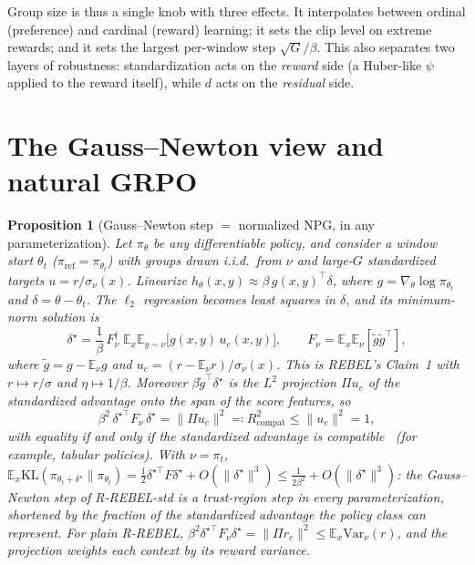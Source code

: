 \documentclass[11pt]{article}
\newtheorem{proposition}[theorem]{Proposition}
\theoremstyle{definition}
\theoremstyle{remark}
\newcommand{\E}{\mathbb{E}}
\newcommand{\KL}{\mathrm{KL}}
\newcommand{\Var}{\mathrm{Var}}
\newcommand{\pref}{\pi_{\mathrm{ref}}}
\newcommand{\1}{\mathbb{1}}
\newcommand{\rr}{R-REBEL}
\newcommand{\rrs}{R-REBEL-std}
\begin{document}
Group size is thus a single knob with three effects. It interpolates between
ordinal (preference) and cardinal (reward) learning; it sets the clip level on
extreme rewards; and it sets the largest per-window step $\sqrt G/\beta$. This also
separates two layers of robustness: standardization acts on the \emph{reward} side
(a Huber-like $\psi$ applied to the reward itself), while $d$ acts on the
\emph{residual} side.

\section{The Gauss--Newton view and natural GRPO}\label{sec:gn}

\begin{proposition}[Gauss--Newton step $=$ normalized NPG, in any parameterization]\label{prop:gn}
Let $\pi_\theta$ be any differentiable policy, and consider a window start $\theta_t$
($\pref=\pi_{\theta_t}$) with groups drawn i.i.d.\ from $\nu$ and large-$G$ standardized
targets $u=r/\sigma_\nu(x)$. Linearize $h_\theta(x,y)\approx\beta\,g(x,y)^\top\delta$, where
$g=\nabla_\theta\log\pi_{\theta_t}$ and $\delta=\theta-\theta_t$. The $\ell_2$
regression becomes least squares in $\delta$, and its minimum-norm solution is
\begin{equation}\label{eq:gn}
  \delta^\star=\frac1\beta\,F_\nu^{\dagger}\;\E_x\E_{y\sim\nu}\bigl[g(x,y)\,u_c(x,y)\bigr],
  \qquad F_\nu=\E_x\E_\nu[\tilde g\tilde g^\top],
\end{equation}
where $\tilde g=g-\E_\nu g$ and $u_c=(r-\E_\nu r)/\sigma_\nu(x)$. This is REBEL's
Claim~1 with $r\mapsto r/\sigma$ and $\eta\mapsto1/\beta$. Moreover
$\beta\tilde g^\top\delta^\star$ is the $L^2$ projection $\Pi u_c$ of the standardized
advantage onto the span of the score features, so
\begin{equation}\label{eq:gnbound}
  \beta^2\,\delta^{\star\top}F_\nu\,\delta^\star=\|\Pi u_c\|^2\eqqcolon R^2_{\mathrm{compat}}\le\|u_c\|^2=1,
\end{equation}
with equality if and only if the standardized advantage is compatible~\cite{sutton,kakade}
(for example, tabular policies). With $\nu=\pi_t$,
$\E_x\KL(\pi_{\theta_t+\delta^\star}\|\pi_{\theta_t})=\frac12\delta^{\star\top}F\delta^\star+O(\|\delta^\star\|^3)\le\frac{1}{2\beta^2}+O(\|\delta^\star\|^3)$:
\emph{the Gauss--Newton step of \rrs{} is a trust-region step in every
parameterization}, shortened by the fraction of the standardized advantage the
policy class can represent. For plain \rr{},
$\beta^2\delta^{\star\top}F_\nu\delta^\star=\|\Pi r_c\|^2\le\E_x\Var_\nu(r)$, and the
projection weights each context by its reward variance.
\end{proposition}
\end{document}

